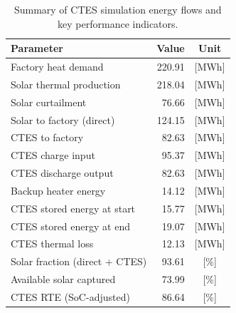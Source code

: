 \renewcommand{\arraystretch}{1.2}
\begin{table}[h]
\centering
\begin{tabular}{l|r c}
\hline
Parameter & Value & Unit \\
\hline
Factory heat demand & 220.91 & [MWh] \\
Solar thermal production & 218.04 & [MWh] \\
Solar curtailment & 76.66 & [MWh] \\
Solar to factory (direct) & 124.15 & [MWh] \\
CTES to factory & 82.63 & [MWh] \\
CTES charge input & 95.37 & [MWh] \\
CTES discharge output & 82.63 & [MWh] \\
Backup heater energy & 14.12 & [MWh] \\
CTES stored energy at start & 15.77 & [MWh] \\
CTES stored energy at end & 19.07 & [MWh] \\
CTES thermal loss & 12.13 & [MWh] \\
\hline
Solar fraction (direct + CTES) & 93.61 & [\%] \\
Available solar captured & 73.99 & [\%] \\
CTES RTE (SoC-adjusted) & 86.64 & [\%] \\
\hline
\end{tabular}
\caption{Summary of CTES simulation energy flows and key performance indicators.}
\label{tab:ctes-simulation-summary}
\end{table}
